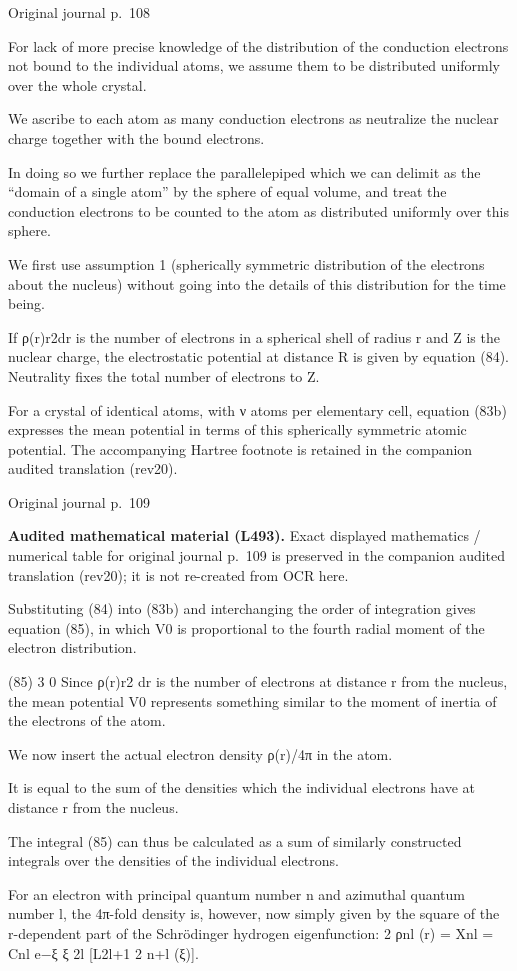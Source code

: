 \documentclass[10pt]{article}
\newcommand{\origpage}[1]{\par\medskip\noindent\hfill{\small\color{notegray}Original journal p.~#1}\hfill\mbox{}\par\smallskip}
\newcommand{\mathref}[2]{\par\smallskip\noindent\colorbox{gray!8}{\parbox{0.95\linewidth}{\small\color{notegray}\textbf{Audited mathematical material (L#1).} Exact displayed mathematics / numerical table for original journal p.~#2 is preserved in the companion audited translation (rev20); it is not re-created from OCR here.}}\par\smallskip}
\begin{document}
\origpage{108}
For lack of more precise knowledge of the distribution of the conduction electrons not bound to the individual atoms, we assume them to be distributed uniformly over the whole crystal.\par
We ascribe to each atom as many conduction electrons as neutralize the nuclear charge together with the bound electrons.\par
In doing so we further replace the parallelepiped which we can delimit as the “domain of a single atom” by the sphere of equal volume, and treat the conduction electrons to be counted to the atom as distributed uniformly over this sphere.\par
We first use assumption 1 (spherically symmetric distribution of the electrons about the nucleus) without going into the details of this distribution for the time being.\par
If ρ(r)r2dr is the number of electrons in a spherical shell of radius r and Z is the nuclear charge, the electrostatic potential at distance R is given by equation (84). Neutrality fixes the total number of electrons to Z.\par
For a crystal of identical atoms, with ν atoms per elementary cell, equation (83b) expresses the mean potential in terms of this spherically symmetric atomic potential. The accompanying Hartree footnote is retained in the companion audited translation (rev20).\par
\origpage{109}
\mathref{493}{109}
Substituting (84) into (83b) and interchanging the order of integration gives equation (85), in which V0 is proportional to the fourth radial moment of the electron distribution.\par
(85) 3 0 Since ρ(r)r2 dr is the number of electrons at distance r from the nucleus, the mean potential V0 represents something similar to the moment of inertia of the electrons of the atom.\par
We now insert the actual electron density ρ(r)/4π in the atom.\par
It is equal to the sum of the densities which the individual electrons have at distance r from the nucleus.\par
The integral (85) can thus be calculated as a sum of similarly constructed integrals over the densities of the individual electrons.\par
For an electron with principal quantum number n and azimuthal quantum number l, the 4π-fold density is, however, now simply given by the square of the r-dependent part of the Schrödinger hydrogen eigenfunction: 2 ρnl (r) = Xnl = Cnl e−ξ ξ 2l [L2l+1 2 n+l (ξ)].\par
\end{document}
